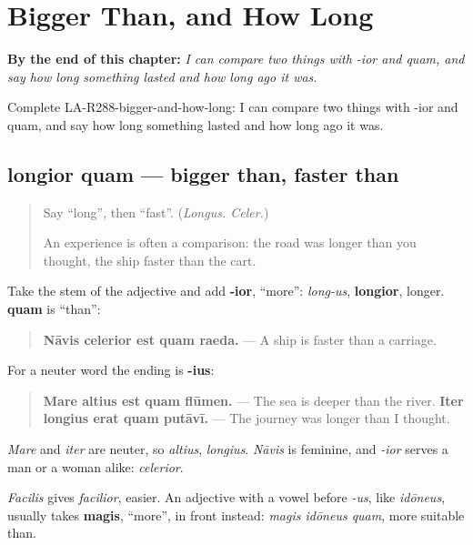 
\chapter{Bigger Than, and How Long}
\label{ch:la-bigger-than-and-how-long}

\begin{chapteropening}
\textbf{By the end of this chapter:} \emph{I can compare two things with -ior and quam, and say how long something lasted and how long ago it was.}

Complete LA-R288-bigger-and-how-long: I can compare two things with -ior and quam, and say how long something lasted and how long ago it was.
\end{chapteropening}

\section[longior quam; maior, minor, melior]{longior quam — bigger than, faster than}

\label{lesson:LA-C288-maior-quam}



\begin{quote}
Say \textquotedblleft{}long\textquotedblright{}, then \textquotedblleft{}fast\textquotedblright{}. (\emph{Longus. Celer.})

An experience is often a comparison: the road was longer than you thought, the ship faster than the cart.
\end{quote}

\begin{grammarlens}[title={Grammar Lens: -ior and quam}]
Take the stem of the adjective and add \textbf{-ior}, \textquotedblleft{}more\textquotedblright{}: \emph{long-us}, \textbf{longior}, longer. \textbf{quam} is \textquotedblleft{}than\textquotedblright{}:

\begin{quote}
\textbf{Nāvis celerior est quam raeda.} — A ship is faster than a carriage.
\end{quote}

For a neuter word the ending is \textbf{-ius}:

\begin{quote}
\textbf{Mare altius est quam flūmen.} — The sea is deeper than the river. \textbf{Iter longius erat quam putāvī.} — The journey was longer than I thought.
\end{quote}

\emph{Mare} and \emph{iter} are neuter, so \emph{altius}, \emph{longius}. \emph{Nāvis} is feminine, and \emph{-ior} serves a man or a woman alike: \emph{celerior}.

\emph{Facilis} gives \emph{facilior}, easier. An adjective with a vowel before \emph{-us}, like \emph{idōneus}, usually takes \textbf{magis}, \textquotedblleft{}more\textquotedblright{}, in front instead: \emph{magis idōneus quam}, more suitable than.
\end{grammarlens}

